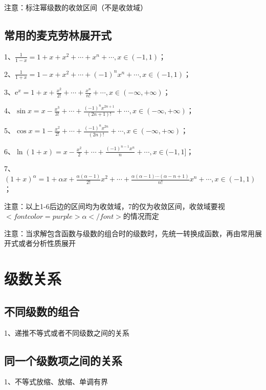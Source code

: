 注意：标注幂级数的收敛区间（不是收敛域）



\subsection{常用的麦克劳林展开式}

1、$ \frac{1}{1-x}=1+x+x^{2}+\cdots+x^{n}+\cdots, x \in(-1,1) $；

2、$ \frac{1}{1+x}=1-x+x^{2}+\cdots+(-1)^{n} x^{n}+\cdots, x \in(-1,1) $；

3、$ \mathrm{e}^{x}=1+x+\frac{x^{2}}{2 !}+\cdots+\frac{x^{n}}{n !}+\cdots, x \in(-\infty,+\infty) $；

4、$ \sin x=x-\frac{x^{3}}{3 !}+\cdots+\frac{(-1)^{n} x^{2 n+1}}{(2 n+1) !}+\cdots, x \in(-\infty,+\infty) $；

5、$ \cos x=1-\frac{x^{2}}{2 !}+\cdots+\frac{(-1)^{n} x^{2 n}}{(2 n) !}+\cdots, x \in(-\infty,+\infty) $；

6、$ \ln (1+x)=x-\frac{x^{2}}{2}+\cdots+\frac{(-1)^{n-1} x^{n}}{n}+\cdots, x \in(-1,1] $；

7、$ (1+x)^{\alpha}=1+\alpha x+\frac{\alpha(\alpha-1)}{2 !} x^{2}+\cdots+\frac{\alpha(\alpha-1) \cdots(\alpha-n+1)}{n !} x^{n}+\cdots, x \in(-1,1) $；

注意：以上1-6后边的区间均为收敛域，7的仅为收敛区间，收敛域要视$ <font color=purple>\alpha</font> $的情况而定

注意：当求解包含函数与级数的组合时的级数时，先统一转换成函数，再由常用展开式或者分析性质展开

\section{级数关系}



\subsection{不同级数的组合}

1、递推不等式或者不同级数之间的关系



\subsection{同一个级数项之间的关系}

1、不等式放缩、放缩、单调有界

